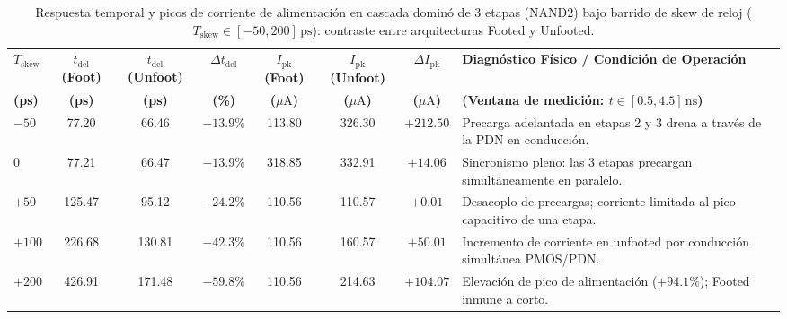 \begin{table}[htbp]
\centering
\fontsize{7.5pt}{8.8pt}\selectfont
\caption[Caracterización de cascada dominó de 3 etapas Footed vs Unfooted]{Respuesta temporal y picos de corriente de alimentación en cascada dominó de 3 etapas (NAND2) bajo barrido de skew de reloj ($T_{\text{skew}} \in [-50, 200]\,\text{ps}$): contraste entre arquitecturas Footed y Unfooted.}
\label{tab:skew_act4}
\begin{tabularx}{\linewidth}{@{}>{\centering\arraybackslash}p{1.2cm} c c c c c c >{\RaggedRight\arraybackslash}X@{}}
\toprule
\textbf{$T_{\text{skew}}$} & \textbf{$t_{\text{del}}$ (Foot)} & \textbf{$t_{\text{del}}$ (Unfoot)} & \textbf{$\Delta t_{\text{del}}$} & \textbf{$I_{\text{pk}}$ (Foot)} & \textbf{$I_{\text{pk}}$ (Unfoot)} & \textbf{$\Delta I_{\text{pk}}$} & \textbf{Diagnóstico Físico / Condición de Operación} \\
\textbf{(ps)} & \textbf{(ps)} & \textbf{(ps)} & \textbf{(\%)} & \textbf{($\mu\text{A}$)} & \textbf{($\mu\text{A}$)} & \textbf{($\mu\text{A}$)} & \textbf{(Ventana de medición: $t \in [0.5, 4.5]\,\text{ns}$)} \\
\midrule
$-50$ & 77.20 & 66.46 & $-13.9\%$ & 113.80 & 326.30 & $+212.50$ & Precarga adelantada en etapas 2 y 3 drena a través de la PDN en conducción. \\
$0$   & 77.21 & 66.47 & $-13.9\%$ & 318.85 & 332.91 & $+14.06$  & Sincronismo pleno: las 3 etapas precargan simultáneamente en paralelo. \\
$+50$ & 125.47 & 95.12 & $-24.2\%$ & 110.56 & 110.57 & $+0.01$   & Desacoplo de precargas; corriente limitada al pico capacitivo de una etapa. \\
$+100$& 226.68 & 130.81& $-42.3\%$ & 110.56 & 160.57 & $+50.01$  & Incremento de corriente en unfooted por conducción simultánea PMOS/PDN. \\
$+200$& 426.91 & 171.48& $-59.8\%$ & 110.56 & 214.63 & $+104.07$ & Elevación de pico de alimentación ($+94.1\%$); Footed inmune a corto. \\
\bottomrule
\end{tabularx}
\end{table}
